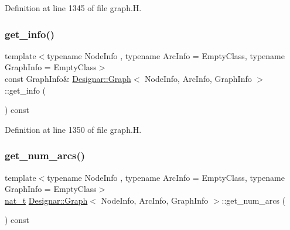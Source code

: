 Definition at line 1345 of file graph.\+H.

\mbox{\label{class_designar_1_1_graph_adfbae301b6a211adaf1919bc41db176a}} 
\subsubsection{\texorpdfstring{get\+\_\+info()}{get\_info()}\hspace{0.1cm}{\footnotesize\ttfamily [2/2]}}
{\footnotesize\ttfamily template$<$typename Node\+Info , typename Arc\+Info  = Empty\+Class, typename Graph\+Info  = Empty\+Class$>$ \\
const Graph\+Info\& \hyperlink{class_designar_1_1_graph}{Designar\+::\+Graph}$<$ Node\+Info, Arc\+Info, Graph\+Info $>$\+::get\+\_\+info (\begin{DoxyParamCaption}{ }\end{DoxyParamCaption}) const\hspace{0.3cm}{\ttfamily [inline]}}



Definition at line 1350 of file graph.\+H.

\mbox{\label{class_designar_1_1_graph_a5b155eda66a4c90f6a34b25c80d9342b}} 
\subsubsection{\texorpdfstring{get\+\_\+num\+\_\+arcs()}{get\_num\_arcs()}}
{\footnotesize\ttfamily template$<$typename Node\+Info , typename Arc\+Info  = Empty\+Class, typename Graph\+Info  = Empty\+Class$>$ \\
\hyperlink{namespace_designar_aa72662848b9f4815e7bf31a7cf3e33d1}{nat\+\_\+t} \hyperlink{class_designar_1_1_graph}{Designar\+::\+Graph}$<$ Node\+Info, Arc\+Info, Graph\+Info $>$\+::get\+\_\+num\+\_\+arcs (\begin{DoxyParamCaption}{ }\end{DoxyParamCaption}) const\hspace{0.3cm}{\ttfamily [inline]}}



